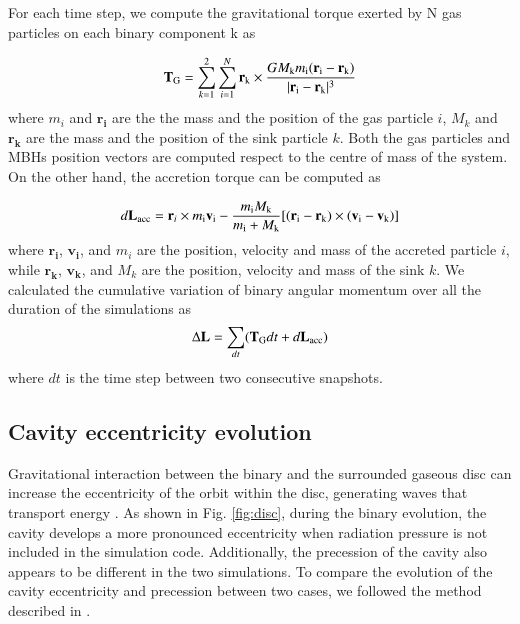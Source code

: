 \documentclass{aa}
\begin{document}
For each time step, we compute the gravitational torque exerted by N gas particles on each binary component k as 

\begin{equation}
    \mathbf{T}_{\rm G} = \sum_{k=1}^{2} \sum_{i=1}^{N} \mathbf{r}_{\rm k} \times \frac{GM_{\rm k}m_{\rm i}(\mathbf{r_{\rm i}}-\mathbf{r}_{\rm k})}{|\mathbf{r_{\rm i}}-\mathbf{r}_{\rm k}|^3}
    \label{eqn:Tg}
\end{equation}
where $m_i$ and $\mathbf{r_i}$ are the the mass and the position of the gas particle $i$, $M_{k}$ and $\mathbf{r_k}$ are the mass and the position of the sink particle $k$. Both the gas particles and MBHs position vectors are computed respect to the centre of mass of the system. On the other hand, the accretion torque can be computed as  

\begin{equation}
    d\mathbf{L}_{\rm acc} = \mathbf{r}_{i} \times m_{\rm i}\mathbf{v}_{\rm i} - \frac{m_{\rm i}M_{\rm k}}{m_{\rm i}+M_{\rm k}}[(\mathbf{r}_{\rm i}-\mathbf{r}_{\rm k})\times (\mathbf{v}_{\rm i}-\mathbf{v}_{\rm k})]
\end{equation}
where $\mathbf{r_{i}}$, $\mathbf{v_{i}}$, and $m_{i}$ are the position, velocity and mass of the accreted particle $i$, while $\mathbf{r_{k}}$, $\mathbf{v_{k}}$, and $M_{k}$ are the position, velocity and mass of the sink $k$. 
We calculated the cumulative variation of binary angular momentum over all the duration of the simulations as
\begin{equation}
    \Delta \mathbf{L} = \sum_{dt} (\mathbf{T}_{\rm G}dt+d\mathbf{L}_{\rm acc})
\end{equation}
where $dt$ is the time step between two consecutive snapshots. 

\subsection{Cavity eccentricity evolution}

Gravitational interaction between the binary and the surrounded gaseous disc can increase the eccentricity of the orbit within the disc, generating waves that transport energy \citep{Macfadyen2008}. As shown in Fig. \ref{fig:disc}, during the binary evolution, the cavity develops a more pronounced eccentricity when radiation pressure is not included in the simulation code. Additionally, the precession of the cavity also appears to be different in the two simulations. To compare the evolution of the cavity eccentricity and precession between two cases, we followed the method described in \citep{SantaBarbara2024}. 
\end{document}
